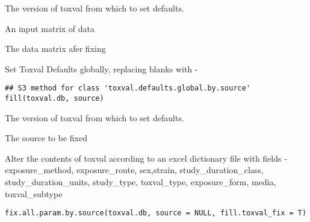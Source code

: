 \documentclass[letterpaper]{book}
\begin{document}
%
\begin{Arguments}
\begin{ldescription}
\item[\code{toxval.db}] The version of toxval from which to set defaults.

\item[\code{mat}] An input matrix of data
\end{ldescription}
\end{Arguments}
%
\begin{Value}
The data matrix afer fixing
\end{Value}
%
\begin{Description}\relax
Set Toxval Defaults globally,  replacing blanks with -
\end{Description}
%
\begin{Usage}
\begin{verbatim}
## S3 method for class 'toxval.defaults.global.by.source'
fill(toxval.db, source)
\end{verbatim}
\end{Usage}
%
\begin{Arguments}
\begin{ldescription}
\item[\code{toxval.db}] The version of toxval from which to set defaults.

\item[\code{source}] The source to be fixed
\end{ldescription}
\end{Arguments}
%
\begin{Description}\relax
Alter the contents of toxval according to an excel dictionary file with fields -
exposure\_method, exposure\_route, sex,strain, study\_duration\_class, study\_duration\_units, study\_type,
toxval\_type, exposure\_form, media, toxval\_subtype
\end{Description}
%
\begin{Usage}
\begin{verbatim}
fix.all.param.by.source(toxval.db, source = NULL, fill.toxval_fix = T)
\end{verbatim}
\end{Usage}
\end{document}
